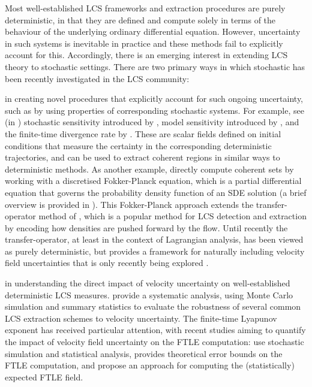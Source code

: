 Most well-established LCS frameworks and extraction procedures are purely deterministic, in that they are defined and compute solely in terms of the behaviour of the underlying ordinary differential equation.
However, uncertainty in such systems is inevitable in practice and these methods fail to explicitly account for this.
Accordingly, there is an emerging interest \citep{Balasuriya_2020_StochasticApproachesLagrangian} in extending LCS theory to stochastic settings.
There are two primary ways in which stochastic has been recently investigated in the LCS community:
\begin{romanate}
	\item in creating novel procedures that explicitly account for such ongoing uncertainty, such as by using properties of corresponding stochastic systems.
	For example, see (in ) stochastic sensitivity introduced by \citet{Balasuriya_2020_StochasticSensitivityComputable}, model sensitivity introduced by \citet{KaszasHaller_2020_UniversalUpperEstimate}, and the finite-time divergence rate by \citet{BranickiUda_2023_PathBasedDivergenceRates}.
	These are scalar fields defined on initial conditions that measure the certainty in the corresponding deterministic trajectories, and can be used to extract coherent regions in similar ways to deterministic methods.
	As another example, \citet{DennerEtAl_2016_ComputingCoherentSets} directly compute coherent sets by working with a discretised Fokker-Planck equation, which is a partial differential equation that governs the probability density function of an SDE solution (a brief overview is provided in ).
	This Fokker-Planck approach extends the transfer-operator method of \citet{Froyland_2013_AnalyticFrameworkIdentifying}, which is a popular method for LCS detection and extraction by encoding how densities are pushed forward by the flow.
	Until recently the transfer-operator, at least in the context of Lagrangian analysis, has been viewed as purely deterministic, but provides a framework for naturally including velocity field uncertainties that is only recently being explored \citet{Balasuriya_2020_StochasticApproachesLagrangian}.

	\item in understanding the direct impact of velocity uncertainty on well-established deterministic LCS measures.
	\citet{BadzaEtAl_2023_HowSensitiveAre} provide a systematic analysis, using Monte Carlo simulation and summary statistics to evaluate the robustness of several common LCS extraction schemes to velocity uncertainty.
	The finite-time Lyapunov exponent has received particular attention, with recent studies aiming to quantify the impact of velocity field uncertainty on the FTLE computation: \citet{GuoEtAl_2016_FiniteTimeLyapunovExponents} use stochastic simulation and statistical analysis, \citet{Balasuriya_2020_UncertaintyFinitetimeLyapunov} provides theoretical error bounds on the FTLE computation, and \citet{YouLeung_2021_ComputingFiniteTime} propose an approach for computing the (statistically) expected FTLE field.


\end{romanate}
